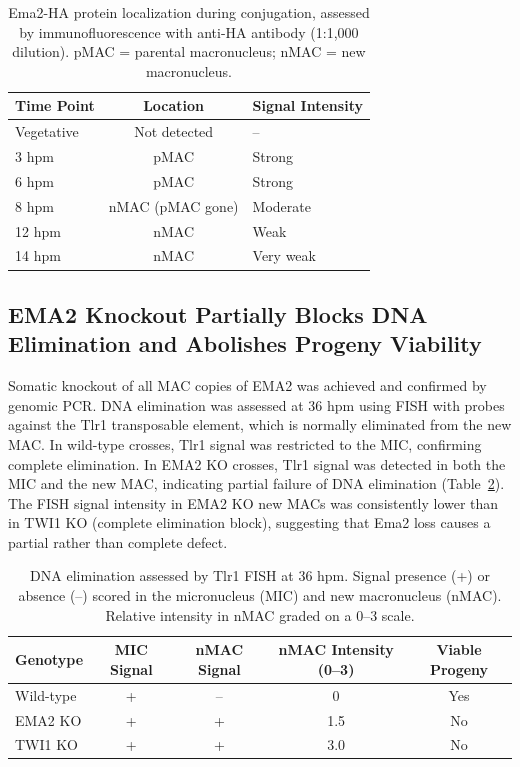\documentclass[11pt]{article}
\begin{document}
\begin{table}[H]
\centering
\caption{Ema2-HA protein localization during conjugation, assessed by immunofluorescence with anti-HA antibody (1:1,000 dilution). pMAC = parental macronucleus; nMAC = new macronucleus.}
\label{tab:localization}
\begin{tabular}{lcl}
\toprule
\textbf{Time Point} & \textbf{Location} & \textbf{Signal Intensity} \\
\midrule
Vegetative & Not detected & -- \\
3 hpm & pMAC & Strong \\
6 hpm & pMAC & Strong \\
8 hpm & nMAC (pMAC gone) & Moderate \\
12 hpm & nMAC & Weak \\
14 hpm & nMAC & Very weak \\
\bottomrule
\end{tabular}
\end{table}

\subsection{EMA2 Knockout Partially Blocks DNA Elimination and Abolishes Progeny Viability}

Somatic knockout of all MAC copies of EMA2 was achieved and confirmed by genomic PCR. DNA elimination was assessed at 36 hpm using FISH with probes against the Tlr1 transposable element, which is normally eliminated from the new MAC. In wild-type crosses, Tlr1 signal was restricted to the MIC, confirming complete elimination. In EMA2 KO crosses, Tlr1 signal was detected in both the MIC and the new MAC, indicating partial failure of DNA elimination (Table~\ref{tab:dna_elimination}). The FISH signal intensity in EMA2 KO new MACs was consistently lower than in TWI1 KO (complete elimination block), suggesting that Ema2 loss causes a partial rather than complete defect.

\begin{table}[H]
\centering
\caption{DNA elimination assessed by Tlr1 FISH at 36 hpm. Signal presence (+) or absence (--) scored in the micronucleus (MIC) and new macronucleus (nMAC). Relative intensity in nMAC graded on a 0--3 scale.}
\label{tab:dna_elimination}
\begin{tabular}{lcccc}
\toprule
\textbf{Genotype} & \textbf{MIC Signal} & \textbf{nMAC Signal} & \textbf{nMAC Intensity (0--3)} & \textbf{Viable Progeny} \\
\midrule
Wild-type & + & -- & 0 & Yes \\
EMA2 KO & + & + & 1.5 & No \\
TWI1 KO & + & + & 3.0 & No \\
\bottomrule
\end{tabular}
\end{table}
\end{document}
